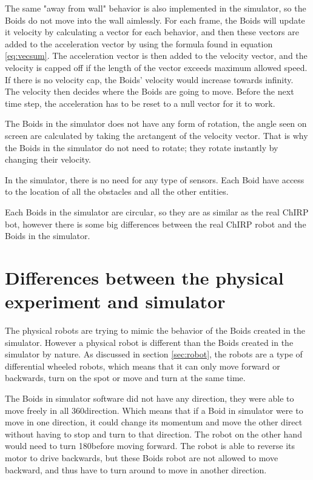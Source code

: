 The same "away from wall" behavior is also implemented in the simulator, so the Boids do not move into the wall aimlessly.
For each frame, the Boids will update it velocity by calculating a vector for each behavior, and then these vectors are added to the acceleration vector by using the formula found in equation \ref{eq:vecsum}. The acceleration vector is then added to the velocity vector, and the velocity is capped off if the length of the vector exceeds maximum allowed speed. If there is no velocity cap, the Boids' velocity would increase towards infinity. The velocity then decides where the Boids are going to move.
Before the next time step, the acceleration has to be reset to a null vector for it to work.

The Boids in the simulator does not have any form of rotation, the angle seen on screen are calculated by taking the arctangent of the velocity vector. That is why the Boids in the simulator do not need to rotate; they rotate instantly by changing their velocity.

In the simulator, there is no need for any type of sensors. Each Boid have access to the location of all the obstacles and all the other entities.

Each Boids in the simulator are circular, so they are as similar as the real ChIRP bot, however there is some big differences between the real ChIRP robot and the Boids in the simulator.

\section{Differences between the physical experiment and simulator}
The physical robots are trying to mimic the behavior of the Boids created in the simulator. However a physical robot is different than the Boids created in the simulator by nature. As discussed in section \ref{sec:robot}, the robots are a type of differential wheeled robots, which means that it can only move forward or backwards, turn on the spot or move and turn at the same time. 

The Boids in simulator software did not have any direction, they were able to move freely in all 360\textdegree direction. Which means that if a Boid in simulator were to move in one direction, it could change its momentum and move the other direct without having to stop and turn to that direction. The robot on the other hand would need to turn 180\textdegree before moving forward. The robot is able to reverse its motor to drive backwards, but these Boids robot are not allowed to move backward, and thus have to turn around to move in another direction.

